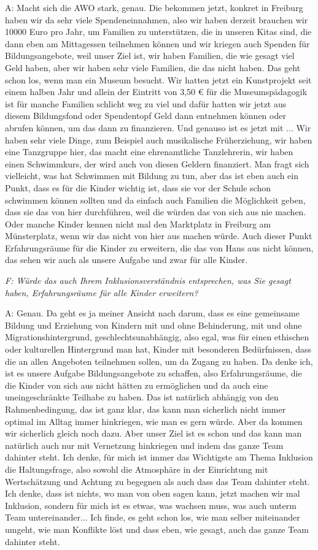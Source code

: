 A: Macht sich die AWO stark, genau. Die bekommen jetzt, konkret in Freiburg haben wir da sehr viele Spendeneinnahmen, also wir haben derzeit brauchen wir 10000 Euro pro Jahr, um Familien zu unterstützen, die in unseren Kitas sind, die dann eben am Mittagessen teilnehmen können und wir kriegen auch Spenden für Bildungsangebote, weil unser Ziel ist, wir haben Familien, die wie gesagt viel Geld haben, aber wir haben sehr viele Familien, die das nicht haben. Das geht schon los, wenn man ein Museum besucht. Wir hatten jetzt ein Kunstprojekt seit einem halben Jahr und allein der Eintritt von 3,50 € für die Museumspädagogik ist für manche Familien schlicht weg zu viel und dafür hatten wir jetzt aus diesem Bildungsfond oder Spendentopf Geld dann entnehmen können oder abrufen können, um das dann zu finanzieren. Und genauso ist es jetzt mit ... Wir haben sehr viele Dinge, zum Beispiel auch musikalische Früherziehung, wir haben eine Tanzgruppe hier, das macht eine ehrenamtliche Tanzlehrerin, wir haben einen Schwimmkurs, der wird auch von diesen Geldern finanziert. Man fragt sich vielleicht, was hat Schwimmen mit Bildung zu tun, aber das ist eben auch ein Punkt, dass es für die Kinder wichtig ist, dass sie vor der Schule schon schwimmen können sollten und da einfach auch Familien die Möglichkeit geben, dass sie das von hier durchführen, weil die würden das von sich aus nie machen. Oder manche Kinder kennen nicht mal den Marktplatz in Freiburg am Münsterplatz, wenn wir das nicht von hier aus machen würde. Auch dieser Punkt Erfahrungsräume für die Kinder zu erweitern, die das von Haus aus nicht können, das sehen wir auch als unsere Aufgabe und zwar für alle Kinder.

\emph{F: Würde das auch Ihrem Inklusionsverständnis entsprechen, was Sie gesagt haben, Erfahrungsräume für alle Kinder erweitern?}

A: Genau. Da geht es ja meiner Ansicht nach darum, dass es eine gemeinsame Bildung und Erziehung von Kindern mit und ohne Behinderung, mit und ohne Migrationshintergrund, geschlechtsunabhängig, also egal, was für einen ethischen oder kulturellen Hintergrund man hat, Kinder mit besonderen Bedürfnissen, dass die an allen Angeboten teilnehmen sollen, um da Zugang zu haben. Da denke ich, ist es unsere Aufgabe Bildungsangebote zu schaffen, also Erfahrungsräume, die die Kinder von sich aus nicht hätten zu ermöglichen und da auch eine uneingeschränkte Teilhabe zu haben. Das ist natürlich abhängig von den Rahmenbedingung, das ist ganz klar, das kann man sicherlich nicht immer optimal im Alltag immer hinkriegen, wie man es gern würde. Aber da kommen wir sicherlich gleich noch dazu. Aber unser Ziel ist es schon und das kann man natürlich auch nur mit Vernetzung hinkriegen und indem das ganze Team dahinter steht. Ich denke, für mich ist immer das Wichtigste am Thema Inklusion die Haltungsfrage, also sowohl die Atmosphäre in der Einrichtung mit Wertschätzung und Achtung zu begegnen als auch dass das Team dahinter steht. Ich denke, dass ist nichts, wo man von oben sagen kann, jetzt machen wir mal Inklusion, sondern für mich ist es etwas, was wachsen muss, was auch unterm Team untereinander... Ich finde, es geht schon los, wie man selber miteinander umgeht, wie man Konflikte löst und dass eben, wie gesagt, auch das ganze Team dahinter steht. 

